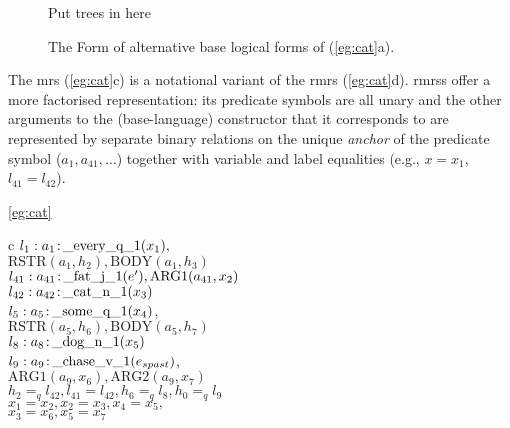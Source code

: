 \begin{figure}[h]

Put trees in here

\caption{The Form of alternative base logical forms of
  (\ref{eg:cat}a).}
\label{fig:1}
\end{figure}

The {\sc mrs} (\ref{eg:cat}c) is a notational variant of the {\sc
  rmrs} (\ref{eg:cat}d). {\sc rmrs}s offer a more factorised
representation: its predicate symbols are all unary and the other
arguments to the (base-language) constructor that it corresponds to
are represented by separate binary relations on the unique {\em
  anchor} of the predicate symbol ($a_1, a_{41},\ldots$) together with
variable and label equalities (e.g., $x=x_1$, $l_{41}=l_{42}$).
\begin{examples}
\item   [\ref{eg:cat}]
\begin{subexamples}
\item   [c]
$l_1:a_1\colon\!\mbox{\_every\_q\_1}(x_1),$\\
\hspace*{0.1in}$\mbox{RSTR}(a_1,h_2),
\mbox{BODY}(a_1,h_3)$\\ 
$l_{41}:a_{41}\colon\!\mbox{\_fat\_j\_1}(e'), \mbox{ARG1}(a_{41},x_2)$\\
$l_{42}:a_{42}\colon\!\mbox{\_cat\_n\_1}(x_3)$\\
$l_5:a_5\colon\!\mbox{\_some\_q\_1}(x_4)$,\\
\hspace*{0.1in}$\mbox{RSTR}(a_5,h_6),
\mbox{BODY}(a_5,h_7)$\\ 
$l_8:a_8\colon\!\mbox{\_dog\_n\_1}(x_5)$\\
$l_9:a_9\colon\!\mbox{\_chase\_v\_1}(e_{spast})$,\\
\hspace*{0.1in}$\mbox{ARG1}(a_9,x_6),
\mbox{ARG2}(a_9,x_7)$\\ 
$h_2=_q l_{42}, l_{41}=l_{42}, h_6 =_q l_8, h_0=_q l_9$\\
$x_1=x_2,x_2=x_3, x_4=x_5,$\\
$x_3=x_6, x_5=x_7$
\end{subexamples}
\end{examples}

